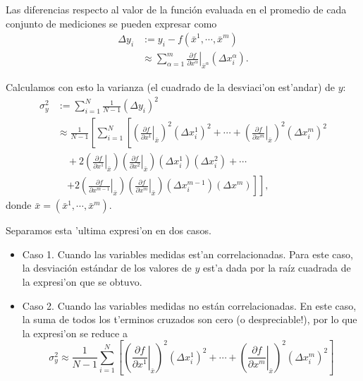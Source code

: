 \documentclass[letterpaper,11pt]{report}
\begin{document}
Las diferencias respecto al valor de la función evaluada en el promedio de cada conjunto de mediciones se pueden expresar como
\begin{align}
\Delta y_i &:= y_i-f(\bar{x}^1,\cdots, \bar{x}^m)\\
&\approx  \sum_{\alpha=1}^m\left.\frac{\partial f}{\partial x^\alpha}\right|_{\bar{x}^\alpha}(\Delta x^\alpha_i).
\end{align}

Calculamos con esto la varianza (el cuadrado de la desviaci'on est'andar) de $y$:
\begin{align}
\sigma_y^2 &:= \sum_{i=1}^N\frac{1}{N-1}(\Delta y_i)^2 \\
&\approx \frac{1}{N-1}\left[\sum_{i=1}^N\left[\left(\left.\frac{\partial f}{\partial x^1}\right|_{\bar{x}}\right)^2 (\Delta x^1_i)^2 +\cdots + \left(\left.\frac{\partial f}{\partial x^m}\right|_{\bar{x}}\right)^2(\Delta x^m_i)^2 \right.\right. \nonumber \\
& \quad +  2\left(\left.\frac{\partial f}{\partial x^1}\right|_{\bar{x}}\right)\left(\left.\frac{\partial f}{\partial x^2}\right|_{\bar{x}}\right)(\Delta x^1_i)(\Delta x^2_i)+\cdots \nonumber\\
& \quad \left.\left.  +2\left(\left.\frac{\partial f}{\partial x^{m-1}}\right|_{\bar{x}}\right) \left(\left.\frac{\partial f}{\partial x^m}\right|_{\bar{x}}\right)(\Delta x^{m-1}_i)(\Delta x^m)\right]\right],
\end{align}
donde $\bar{x}=(\bar{x}^1,\cdots, \bar{x}^m)$.

Separamos esta 'ultima expresi'on en dos casos. 

\begin{itemize}
\item Caso 1. Cuando las variables medidas est'an correlacionadas.
Para este caso, la desviación estándar de los valores de $y$ est'a dada por la raíz cuadrada de la expresi'on que se obtuvo.

\item Caso 2. Cuando las variables medidas no están correlacionadas.
En este caso, la suma de todos los t'erminos cruzados son cero (o despreciable!), por lo que la expresi'on se reduce a
\begin{equation}
\sigma_y^2 \approx \frac{1}{N-1}\sum_{i=1}^N\left[\left(\left.\frac{\partial f}{\partial x^1}\right|_{\bar{x}}\right)^2 (\Delta x^1_i)^2 +\cdots + \left(\left.\frac{\partial f}{\partial x^m}\right|_{\bar{x}}\right)^2(\Delta x^m_i)^2\right]
\end{equation}
\end{itemize}
\end{document}
